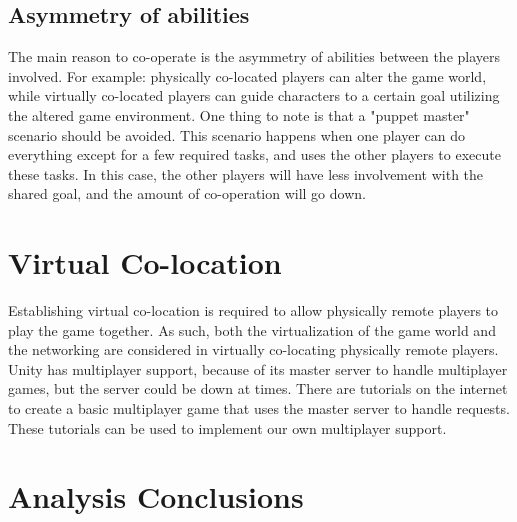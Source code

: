 		\subsection{Asymmetry of abilities}
			The main reason to co-operate is the asymmetry of abilities between
			the players involved. For example: physically co-located players can
			alter the game world, while virtually co-located players can guide
			characters to a certain goal utilizing the altered game environment.
			One thing to note is that a "puppet master" scenario should be avoided.
			This scenario happens when one player can do everything except for a
			few required tasks, and uses the other players to execute these tasks.
			In this case, the other players will have less involvement with the
			shared goal, and the amount of co-operation will go down.
		
	\section{Virtual Co-location} \label{sec:virtualcolocation}
		Establishing virtual co-location is required to allow physically remote players
		to play the game together. As such, both the virtualization of the game world and
		the networking are considered in virtually co-locating physically remote players.
		Unity has multiplayer support, because of its master server to handle multiplayer
		games, but the server could be down at times. There are tutorials on the internet
		to create a basic multiplayer game that uses the master server to handle requests.
		These tutorials can be used to implement our own multiplayer support.
		
	\section{Analysis Conclusions} \label{sec:analysisconclusion}
		
